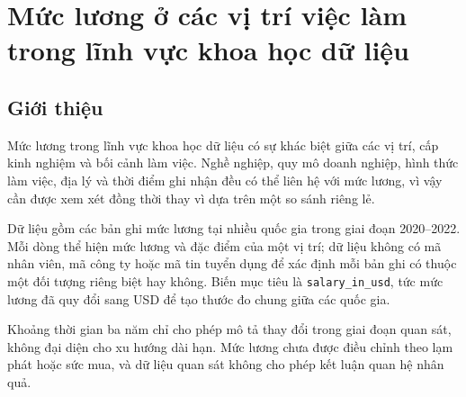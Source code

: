 \section{Mức lương ở các vị trí việc làm trong lĩnh vực khoa học dữ liệu}

\subsection{Giới thiệu}\label{nghi:giux1edbi-thiux1ec7u}

Mức lương trong lĩnh vực khoa học dữ liệu có sự khác biệt giữa các vị
trí, cấp kinh nghiệm và bối cảnh làm việc. Nghề nghiệp, quy mô doanh
nghiệp, hình thức làm việc, địa lý và thời điểm ghi nhận đều có thể liên
hệ với mức lương, vì vậy cần được xem xét đồng thời thay vì dựa trên một
so sánh riêng lẻ.

Dữ liệu gồm các bản ghi mức lương tại nhiều quốc gia trong giai đoạn
2020--2022. Mỗi dòng thể hiện mức lương và đặc điểm của một vị trí; dữ
liệu không có mã nhân viên, mã công ty hoặc mã tin tuyển dụng để xác
định mỗi bản ghi có thuộc một đối tượng riêng biệt hay không. Biến mục
tiêu là \texttt{salary\_in\_usd}, tức mức lương đã quy đổi sang USD để
tạo thước đo chung giữa các quốc gia.

Khoảng thời gian ba năm chỉ cho phép mô tả thay đổi trong giai đoạn quan
sát, không đại diện cho xu hướng dài hạn. Mức lương chưa được điều chỉnh
theo lạm phát hoặc sức mua, và dữ liệu quan sát không cho phép kết luận
quan hệ nhân quả.

